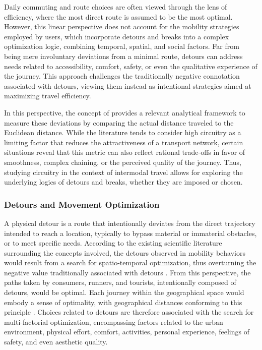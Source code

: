 \begin{refsegment}
Daily commuting and route choices are often viewed through the lens of efficiency, where the most direct route is assumed to be the most optimal. However, this linear perspective does not account for the mobility strategies employed by users, which incorporate detours and breaks into a complex optimization logic, combining temporal, spatial, and social factors. Far from being mere involuntary deviations from a minimal route, detours can address needs related to accessibility, comfort, safety, or even the qualitative experience of the journey. This approach challenges the traditionally negative connotation associated with detours, viewing them instead as intentional strategies aimed at maximizing travel efficiency.%

In this perspective, the concept of  provides a relevant analytical framework to measure these deviations by comparing the actual distance traveled to the Euclidean distance. While the literature tends to consider high circuitry as a limiting factor that reduces the attractiveness of a transport network, certain situations reveal that this metric can also reflect rational trade-offs in favor of smoothness, complex chaining, or the perceived quality of the journey. Thus, studying circuitry in the context of intermodal travel allows for exploring the underlying logics of detours and breaks, whether they are imposed or chosen.%

\subsubsection*{Detours and Movement Optimization
    \label{chap5:detours-optimisation}
}

A physical \gls{detour} is a route that intentionally deviates from the direct trajectory intended to reach a location, typically to bypass material or immaterial obstacles, or to meet specific needs. According to the existing scientific literature surrounding the concepts involved, the detours observed in mobility behaviors would result from a search for spatio-temporal optimization, thus overturning the negative value traditionally associated with detours \textcolor{blue}{\autocite[459]{lhostis_detour_2017}}. From this perspective, the paths taken by consumers, runners, and tourists, intentionally composed of detours, would be optimal. Each journey within the geographical space would embody a sense of optimality, with geographical distances conforming to this principle \textcolor{blue}{\autocite[2]{lhostis_all_2020}}. Choices related to detours are therefore associated with the search for multi-factorial optimization, encompassing factors related to the urban environment, physical effort, comfort, activities, personal experience, feelings of safety, and even aesthetic quality.%


\end{refsegment}
